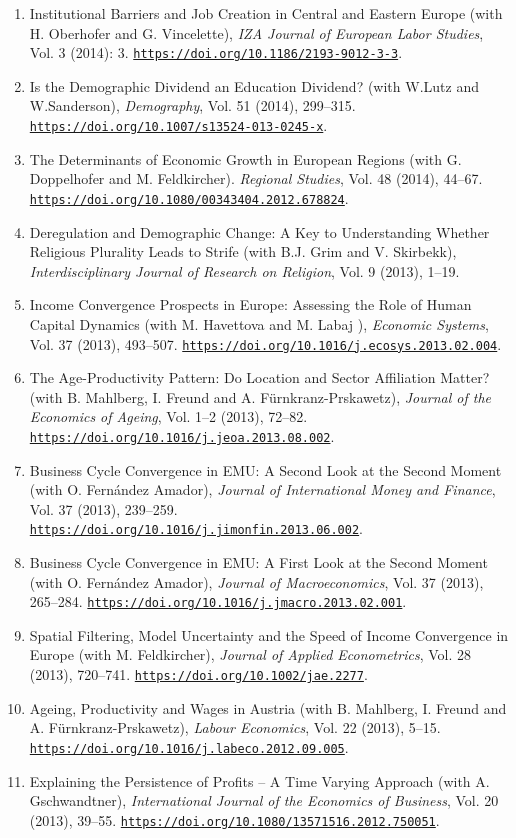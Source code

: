\documentclass[10pt]{res} %
\newcommand{\doiurl}[1]{\href{https://doi.org/#1}{\nolinkurl{https://doi.org/#1}}}
\begin{document}
\begin{resume}
\begin{enumerate}
\item Institutional Barriers and Job Creation in Central and Eastern Europe (with H. Oberhofer and G. Vincelette), \textit{IZA Journal of European Labor Studies}, Vol. 3 (2014): 3. \doiurl{10.1186/2193-9012-3-3}.
\item Is the Demographic Dividend an Education Dividend? (with W.Lutz and W.Sanderson),\textit{ Demography}, Vol. 51 (2014), 299--315. \doiurl{10.1007/s13524-013-0245-x}.
\item The Determinants of Economic Growth in European Regions (with G. Doppelhofer and M. Feldkircher). \textit{Regional Studies}, Vol. 48 (2014), 44--67. \doiurl{10.1080/00343404.2012.678824}.
\item Deregulation and Demographic Change: A Key to Understanding Whether Religious Plurality Leads to Strife (with B.J. Grim and V. Skirbekk), \textit{Interdisciplinary Journal of Research on Religion}, Vol. 9 (2013), 1--19.
\item Income Convergence Prospects in Europe: Assessing the Role of Human Capital Dynamics (with M. Havettova and M. Labaj ),\textit{ Economic Systems}, Vol. 37 (2013), 493--507. \doiurl{10.1016/j.ecosys.2013.02.004}.
\item The Age-Productivity Pattern: Do Location and Sector Affiliation Matter? (with B. Mahlberg, I. Freund and A. F\"urnkranz-Prskawetz), \textit{Journal of the Economics of Ageing}, Vol. 1--2 (2013), 72--82. \doiurl{10.1016/j.jeoa.2013.08.002}.
\item Business Cycle Convergence in EMU: A Second Look at the Second Moment (with O. Fern\'andez Amador), \textit{Journal of International Money and Finance}, Vol. 37 (2013), 239--259. \doiurl{10.1016/j.jimonfin.2013.06.002}.
\item Business Cycle Convergence in EMU: A First Look at the Second Moment (with O. Fern\'andez Amador), \textit{Journal of Macroeconomics}, Vol. 37 (2013), 265--284. \doiurl{10.1016/j.jmacro.2013.02.001}.
\item Spatial Filtering, Model Uncertainty and the Speed of Income Convergence in Europe (with M. Feldkircher), \textit{Journal of Applied Econometrics}, Vol. 28 (2013), 720--741. \doiurl{10.1002/jae.2277}.
\item Ageing, Productivity and Wages in Austria (with B. Mahlberg, I. Freund and A. F\"urnkranz-Prskawetz), \textit{Labour Economics}, Vol. 22 (2013), 5--15. \doiurl{10.1016/j.labeco.2012.09.005}.
\item Explaining the Persistence of Profits -- A Time Varying Approach (with A. Gschwandtner), \textit{International Journal of the Economics of Business}, Vol. 20 (2013), 39--55. \doiurl{10.1080/13571516.2012.750051}.

\end{enumerate}
\end{resume}
\end{document}
